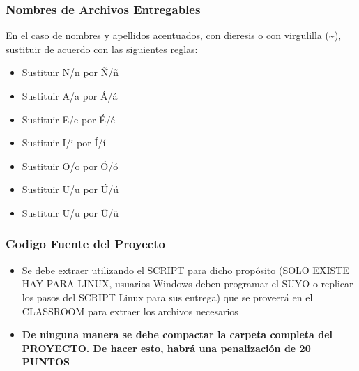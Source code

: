 \begin{frame}
\frametitle{Nombres de Archivos Entregables}
En el caso de nombres y apellidos acentuados, con dieresis o con virgulilla (\textasciitilde{}), sustituir de acuerdo con las siguientes reglas:
\begin{itemize}
\item Sustituir N/n por \~N/\~n
\item Sustituir A/a por \'A/\'a
\item Sustituir E/e por \'E/\'e
\item Sustituir I/i por \'I/\'i
\item Sustituir O/o por \'O/\'o
\item Sustituir U/u por \'U/\'u
\item Sustituir U/u por \"U/\"u
\end{itemize}
\end{frame}



\begin{frame}
\frametitle{Codigo Fuente del Proyecto}
\begin{itemize}
\item Se debe extraer utilizando el SCRIPT para dicho prop\'osito (SOLO EXISTE HAY PARA LINUX, usuarios Windows deben programar el SUYO o replicar los pasos del SCRIPT Linux para sus entrega) que se proveerá en el CLASSROOM para extraer los archivos necesarios
\item \textbf{De ninguna manera se debe compactar la carpeta completa del PROYECTO. De hacer esto, habr\'a una penalizaci\'on de 20 PUNTOS}
\end{itemize}

\end{frame}


